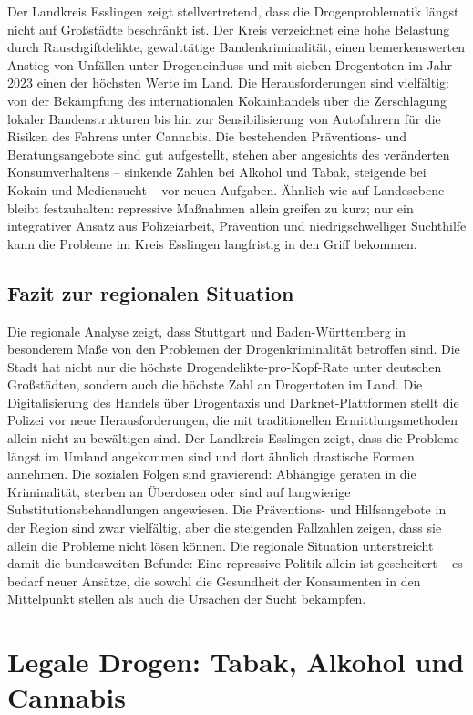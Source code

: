 \documentclass[11pt,a4paper]{article}
\begin{document}
	Der Landkreis Esslingen zeigt stellvertretend, dass die Drogenproblematik längst nicht auf Großstädte beschränkt ist. Der Kreis verzeichnet eine hohe Belastung durch Rauschgiftdelikte, gewalttätige Bandenkriminalität, einen bemerkenswerten Anstieg von Unfällen unter Drogeneinfluss und mit sieben Drogentoten im Jahr 2023 einen der höchsten Werte im Land. Die Herausforderungen sind vielfältig: von der Bekämpfung des internationalen Kokainhandels über die Zerschlagung lokaler Bandenstrukturen bis hin zur Sensibilisierung von Autofahrern für die Risiken des Fahrens unter Cannabis. Die bestehenden Präventions- und Beratungsangebote sind gut aufgestellt, stehen aber angesichts des veränderten Konsumverhaltens – sinkende Zahlen bei Alkohol und Tabak, steigende bei Kokain und Mediensucht – vor neuen Aufgaben. Ähnlich wie auf Landesebene bleibt festzuhalten: repressive Maßnahmen allein greifen zu kurz; nur ein integrativer Ansatz aus Polizeiarbeit, Prävention und niedrigschwelliger Suchthilfe kann die Probleme im Kreis Esslingen langfristig in den Griff bekommen.
	
	\subsection{Fazit zur regionalen Situation}
	
	Die regionale Analyse zeigt, dass Stuttgart und Baden-Württemberg in besonderem Maße von den Problemen der Drogenkriminalität betroffen sind. Die Stadt hat nicht nur die höchste Drogendelikte-pro-Kopf-Rate unter deutschen Großstädten, sondern auch die höchste Zahl an Drogentoten im Land. Die Digitalisierung des Handels über Drogentaxis und Darknet-Plattformen stellt die Polizei vor neue Herausforderungen, die mit traditionellen Ermittlungsmethoden allein nicht zu bewältigen sind. Der Landkreis Esslingen zeigt, dass die Probleme längst im Umland angekommen sind und dort ähnlich drastische Formen annehmen. Die sozialen Folgen sind gravierend: Abhängige geraten in die Kriminalität, sterben an Überdosen oder sind auf langwierige Substitutionsbehandlungen angewiesen. Die Präventions- und Hilfsangebote in der Region sind zwar vielfältig, aber die steigenden Fallzahlen zeigen, dass sie allein die Probleme nicht lösen können. Die regionale Situation unterstreicht damit die bundesweiten Befunde: Eine repressive Politik allein ist gescheitert – es bedarf neuer Ansätze, die sowohl die Gesundheit der Konsumenten in den Mittelpunkt stellen als auch die Ursachen der Sucht bekämpfen.
	
	\section{Legale Drogen: Tabak, Alkohol und Cannabis}
	
\end{document}
